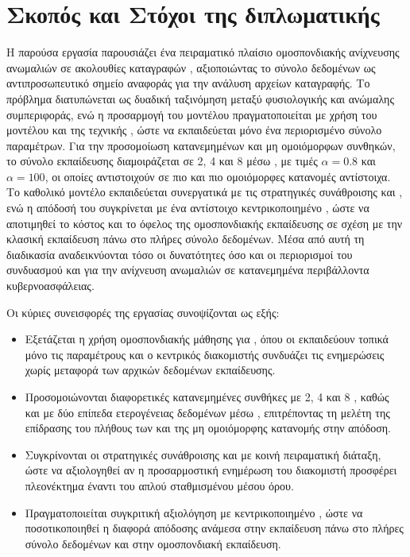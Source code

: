 \section{Σκοπός και Στόχοι της διπλωματικής}

Η παρούσα εργασία παρουσιάζει ένα πειραματικό πλαίσιο ομοσπονδιακής ανίχνευσης ανωμαλιών σε ακολουθίες καταγραφών , αξιοποιώντας το σύνολο δεδομένων  ως αντιπροσωπευτικό σημείο αναφοράς για την ανάλυση αρχείων καταγραφής. Το πρόβλημα διατυπώνεται ως δυαδική ταξινόμηση μεταξύ φυσιολογικής και ανώμαλης συμπεριφοράς, ενώ η προσαρμογή του μοντέλου πραγματοποιείται με χρήση του μοντέλου  και της τεχνικής , ώστε να εκπαιδεύεται μόνο ένα περιορισμένο σύνολο παραμέτρων. Για την προσομοίωση κατανεμημένων και μη ομοιόμορφων συνθηκών, το σύνολο εκπαίδευσης διαμοιράζεται σε 2, 4 και 8  μέσω , με τιμές \(\alpha=0.8\) και \(\alpha=100\), οι οποίες αντιστοιχούν σε πιο  και πιο ομοιόμορφες κατανομές αντίστοιχα. Το καθολικό μοντέλο εκπαιδεύεται συνεργατικά με τις στρατηγικές συνάθροισης  και , ενώ η απόδοσή του συγκρίνεται με ένα αντίστοιχο κεντρικοποιημένο , ώστε να αποτιμηθεί το κόστος και το όφελος της ομοσπονδιακής εκπαίδευσης σε σχέση με την κλασική εκπαίδευση πάνω στο πλήρες σύνολο δεδομένων. Μέσα από αυτή τη διαδικασία αναδεικνύονται τόσο οι δυνατότητες όσο και οι περιορισμοί του συνδυασμού  και  για την ανίχνευση ανωμαλιών σε κατανεμημένα περιβάλλοντα κυβερνοασφάλειας.

Οι κύριες συνεισφορές της εργασίας συνοψίζονται ως εξής:

\begin{itemize}
    \item Εξετάζεται η χρήση ομοσπονδιακής μάθησης για , όπου οι  εκπαιδεύουν τοπικά μόνο τις παραμέτρους  και ο κεντρικός διακομιστής συνδυάζει τις ενημερώσεις χωρίς μεταφορά των αρχικών δεδομένων εκπαίδευσης.
    \item Προσομοιώνονται διαφορετικές κατανεμημένες συνθήκες με 2, 4 και 8 , καθώς και με δύο επίπεδα ετερογένειας δεδομένων μέσω , επιτρέποντας τη μελέτη της επίδρασης του πλήθους των  και της μη ομοιόμορφης κατανομής στην απόδοση.
    \item Συγκρίνονται οι στρατηγικές συνάθροισης  και  με κοινή πειραματική διάταξη, ώστε να αξιολογηθεί αν η προσαρμοστική ενημέρωση του διακομιστή προσφέρει πλεονέκτημα έναντι του απλού σταθμισμένου μέσου όρου.
    \item Πραγματοποιείται συγκριτική αξιολόγηση με κεντρικοποιημένο , ώστε να ποσοτικοποιηθεί η διαφορά απόδοσης ανάμεσα στην εκπαίδευση πάνω στο πλήρες σύνολο δεδομένων και στην ομοσπονδιακή εκπαίδευση.
\end{itemize}

